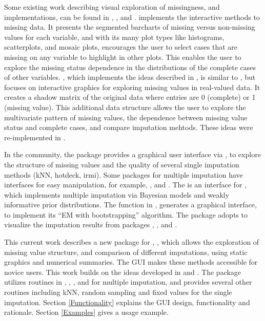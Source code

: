 \documentclass[article]{jss}
\begin{document}
Some existing work describing visual exploration of missingness,
and implementations, can be found in \citet{unwin1996interactive},
\citet{swayne1998missing}, and \citet{templ2008visualization}.
 \citep{unwin1996interactive} implements the
interactive methods to missing data. It presents the segmented
barcharts of missing versus non-missing values for each variable,
and with its many plot types like histograms, scatterplots, and
mosaic plots, encourages the user to select cases that are missing
on any variable to highlight in other plots. This enables the user
to explore the missing status dependence in the distributions of
the complete cases of other variables. 
\citep{swayne1998xgobi}, which implements the ideas described in
\citet{swayne1998missing}, is similar to , but
focuses on interactive graphics for exploring missing values in
real-valued data. It creates a shadow matrix of the original data
where entries are 0 (complete) or 1 (missing value). This additional
data structure allows the user to explore the multivariate pattern
of missing values, the dependence between missing value status
and complete cases, and compare imputation mehtods. These ideas
were re-implemented in  \citep{STLBC03}.

In the  community, the package  \citep{VIM}
provides a graphical user interface via  \citep{VIMGUI},
to explore the structure of missing values and the quality of
several single imputation methods (kNN, hotdeck, irmi). Some
packages for multiple imputation have interfaces for easy manipulation,
for example, ,  and .
The  \citep{migui} is an interface for  \citep{mi},
which implements multiple imputation via Bayesian models and weakly
informative prior distributions. The function 
in  \citep{amelia}, generates a graphical interface,
to implement its ``EM with bootstrapping'' algorithm. The package
 \citep{mip} adopts  to visualize the imputation
results from packages , , and .

This current work describes a new package for ,
, which allows the exploration of missing
value structure, and comparison of different imputations, using
static graphics and numerical summaries. The GUI makes these
methods accessible for novice users. This work builds on the ideas
developed in \citet{unwin1996interactive} and \citet{swayne1998missing}.
The package utilizes routines in , , ,
and  for multiple imputation, and provides several other
routines including kNN, random sampling and fixed values for the
single imputation. Section \ref{Functionality} explains the GUI
design, functionality and rationale.  Section \ref{Examples} gives
a usage example.
\end{document}
